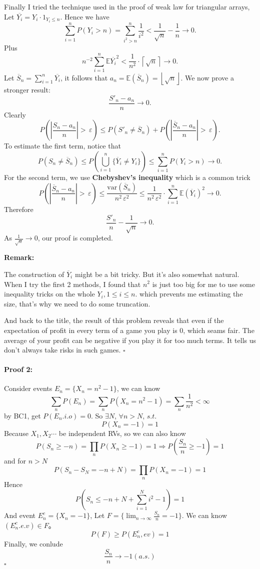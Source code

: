 \documentclass[UTF8]{article}
\let\ldots\cdots
\newcommand\ep{\,\varepsilon}
\begin{document}
		Finally I tried the technique used in the proof of weak law for triangular arrays, 
		Let $\overline{Y_{i}}= Y_{i} \cdot 1_{Y_{i} \le  n}$. Hence we have 
		\[
				\sum_{i=1}^{n} P\left( Y_{i} > n \right) = 
				\sum_{i^2 > n}^{n} \frac{1}{i^2} < \frac{1}{\sqrt{n} } - \frac{1}{n}
				\to  0
		.\]
		Plus 
		\[
		n^{-2} \sum_{i=1}^{n} \mathbb{E} \overline{Y_i}^2 < 
		\frac{1}{n^2} \cdot \left\lceil \sqrt{n}  \right\rceil \to  0 
		.\] 
		Let $\overline{S}_n = \sum_{i=1}^{n} \overline{Y_i}$, it follows 
		that $a_n = \mathbb{E} \left( \overline{S}_n \right) = \left\lfloor \sqrt{n}  \right\rfloor$. We now prove a stronger result: 
		\[
				\frac{ S'_n -a_n }{n} \to  0  
		.\] 
		Clearly
		\[
				P\left( \left| \frac{S_n-a_n}{n} \right| > \ep \right) \le 
				P\left( S'_n \neq \overline{S}_n \right) + 
				P \left( \left| \frac{\overline{S}_n-a_n}{n} \right| > \ep  \right) 
		.\] 
		To estimate the first term, notice that 
		\[
				P\left( S_n \neq \overline{S}_n \right) \le  
				P \left( \bigcup_{i=1}^{n} \{ \overline{Y}_i\neq Y_i\}   \right) 
				\le \sum_{i=1}^{n} P\left( Y_i > n \right) \to 0
		.\] 
		For the second term, we use \textbf{Chebyshev's inequality} which is a 
		common trick
		\[
				P \left( \left| \frac{\overline{S}_n-a_n}{n} \right| > \ep  \right) 
				\le  \frac{ \mathrm{var}\left( \overline{S}_n \right)   }{ n^2\ep^2}
				\le \frac{1}{n^2\ep^2} \cdot \sum_{i=1}^{n} \mathbb{E} \left( \overline{Y}_i \right) ^2 \to 0
		.\] 
		Therefore 
		\[
				\frac{S'_n }{n} - \frac{1}{\sqrt{n} } \to 0 
		.\] 
		As $\frac{1}{\sqrt{n} }\to 0$, our proof is completed.

		\noindent \textbf{Remark:}

		The construction of $\overline{Y}_i$ might be a bit tricky. But it's also somewhat natural. When I try the first 2 methods, I found that $n^2$ is just too big for 
		me to use some inequality tricks on the whole $Y_i,1\le i\le n$. 
		which prevents me estimating the size, that's why we need to do some truncation.

		And back to the title, the result of this problem reveals that even if the 
		expectation of profit in every term of a game you play is 0, which seams 
		fair. The average of your profit
		can be negative if you play it for too much terms. It tells us don't always take 
		risks in such games.
		\hfill$\square$

\paragraph{Proof 2:}
	Consider events $E_n = \{X_n = n^2-1\}$, we can know
	$$
	\sum_n P(E_n) = \sum_n P(X_n = n^2-1)=\sum_n \frac 1 {n^2} < \infty
	$$
	by BC1, get $P(E_n.i.o)=0$. So $\exists N$, $\forall n > N$, $s.t.$
	$$
	P(X_n = -1) = 1
	$$
	Because $X_1,X_2\ldots$ be independent RVs, so we can also know
	$$
	P(S_n \geq -n) = \prod _n P(X_n \geq -1) = 1 \Rightarrow P(\frac {S_n} n \geq -1) = 1
	$$
	and for $n > N$
	$$
	P(S_n - S_N = -n + N) = \prod _n P(X_n = -1) = 1
	$$
	Hence
	$$
	P(S_n \leq -n + N + \sum_{i=1}^N {i^2-1})=1
	$$
	And event $E_n^c = \{ X_n = -1 \}$,
	Let $F = \{ \lim_{n \rightarrow \infty} \frac {S_n} n = -1\}$. We can know $(E_n^c. e.v) \in F$。
	$$
	P(F) \geq P(E_n^c, ev) = 1
	$$
	Finally, we conlude
	$$
	\frac {S_n} n \rightarrow -1 (a.s.)
	$$
	\hfill$\square$
\end{document}
